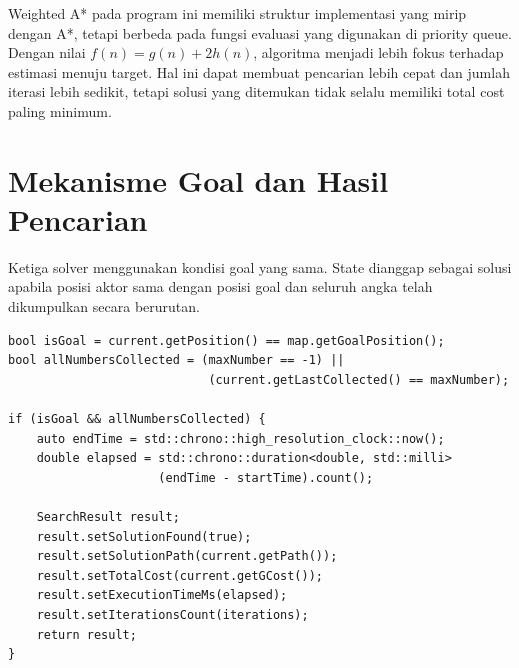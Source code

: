 \begin{tcolorbox}[
	colback=purple!5,
	colframe=purple!60!black,
	title=\textbf{Karakteristik Implementasi Weighted A*},
	arc=2mm,
	boxrule=0.8pt
]
Weighted A* pada program ini memiliki struktur implementasi yang mirip dengan A*, tetapi berbeda pada fungsi evaluasi yang digunakan di priority queue. 
Dengan nilai $f(n)=g(n)+2h(n)$, algoritma menjadi lebih fokus terhadap estimasi menuju target. 
Hal ini dapat membuat pencarian lebih cepat dan jumlah iterasi lebih sedikit, tetapi solusi yang ditemukan tidak selalu memiliki total cost paling minimum.
\end{tcolorbox}

\section{Mekanisme Goal dan Hasil Pencarian}

Ketiga solver menggunakan kondisi goal yang sama. 
State dianggap sebagai solusi apabila posisi aktor sama dengan posisi goal dan seluruh angka telah dikumpulkan secara berurutan.

\begin{tcolorbox}[
	colback=blue!5,
	colframe=blue!60!black,
	title=\textbf{Potongan Source Code Asli: Pemeriksaan Goal dan SearchResult},
	arc=2mm,
	boxrule=0.8pt
]
\small
\begin{verbatim}
bool isGoal = current.getPosition() == map.getGoalPosition();
bool allNumbersCollected = (maxNumber == -1) || 
                            (current.getLastCollected() == maxNumber);

if (isGoal && allNumbersCollected) {
    auto endTime = std::chrono::high_resolution_clock::now();
    double elapsed = std::chrono::duration<double, std::milli>
                     (endTime - startTime).count();

    SearchResult result;
    result.setSolutionFound(true);
    result.setSolutionPath(current.getPath());
    result.setTotalCost(current.getGCost());
    result.setExecutionTimeMs(elapsed);
    result.setIterationsCount(iterations);
    return result;
}
\end{verbatim}
\end{tcolorbox}


